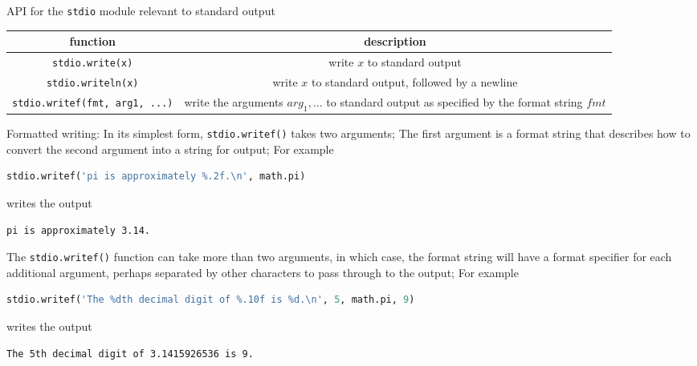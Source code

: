 \documentclass[8pt,a4paper,compress]{beamer}
\begin{document}
\begin{frame}[fragile]
API for the \lstinline{stdio} module relevant to standard output
\begin{center}
\begin{tabular}{cc}
function & description \\ \hline
\lstinline$stdio.write(x)$ & write $x$ to standard output \\
\lstinline$stdio.writeln(x)$ & write $x$ to standard output, followed by a newline \\
\lstinline$stdio.writef(fmt, arg1, ...)$ & \makecell{write the arguments $arg_1, \dots$ to standard output \\ as specified by the format string $fmt$} \\
\end{tabular} 
\end{center}

\bigskip

Formatted writing: In its simplest form, \lstinline{stdio.writef()} takes two arguments; The first argument is a format string that describes how to convert the second argument into a string for output;  For example
\begin{lstlisting}[language=Python]
stdio.writef('pi is approximately %.2f.\n', math.pi)
\end{lstlisting}
writes the output
\begin{lstlisting}[language={}]
pi is approximately 3.14.
\end{lstlisting}

\bigskip

The \lstinline{stdio.writef()} function can take more than two arguments, in which case, the format string will have a format specifier for each additional argument, perhaps separated by other characters to pass through to the output; For example
\begin{lstlisting}[language=Python]
stdio.writef('The %dth decimal digit of %.10f is %d.\n', 5, math.pi, 9)
\end{lstlisting}
writes the output
\begin{lstlisting}[language={}]
The 5th decimal digit of 3.1415926536 is 9.
\end{lstlisting}
\end{frame}
\end{document}
